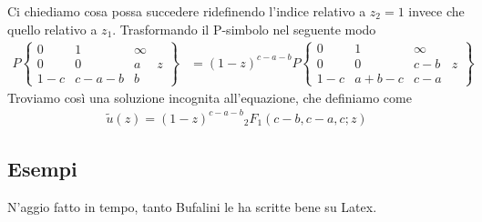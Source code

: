 Ci chiediamo cosa possa succedere ridefinendo l'indice relativo a $z_2=1$ invece che quello relativo a $z_1$.
Trasformando il P-simbolo nel seguente modo
\begin{align}
	P\left\{\begin{matrix}
		0   & 1     & \infty & \\
		0   & 0     & a      & z\\
		1-c & c-a-b & b      & 
	\end{matrix}\right\} &= (1-z)^{c-a-b} P\left\{\begin{matrix}
		0   & 1     & \infty & \\
		0 	& 0     & c-b  & z\\
		1-c & a+b-c & c-a  & 
	\end{matrix}\right\}
\end{align}
Troviamo così una soluzione incognita all'equazione, che definiamo come
\begin{align}
	\tilde{u}(z) = (1-z)^{c-a-b} {}_2F_1(c-b,c-a,c; z)
\end{align}



\newpage
\subsection{Esempi}
N'aggio fatto in tempo, tanto Bufalini le ha scritte bene su Latex.